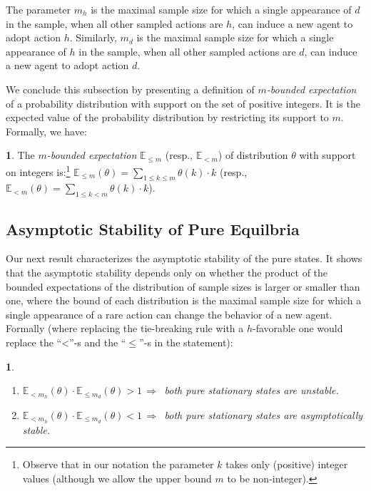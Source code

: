\documentclass[12pt]{article}
\numberwithin{equation}{section}
\numberwithin{figure}{section}
\theoremstyle{definition}
\newtheorem{defn}{\protect\definitionname}
\theoremstyle{plain}
\theoremstyle{plain}
\newtheorem{prop}{\protect\propositionname}
\theoremstyle{plain}
\theoremstyle{remark}
\theoremstyle{plain}
\theoremstyle{plain}
\providecommand{\definitionname}{Definition}
\providecommand{\propositionname}{Proposition}
\begin{document}
    The parameter $m_{h}$ is the maximal sample size for which
a single appearance of $d$ in the sample, when all other sampled actions are $h$, can induce a new agent to adopt action $h$. Similarly,  $m_{d}$ is the maximal sample size for which a single appearance of $h$ in the sample, when all other sampled actions are $d$, can induce a new agent to adopt action $d$. 
 
We conclude this subsection by presenting a definition of $m$\emph{-bounded expectation} of a probability distribution with support on the set of positive integers. It is the expected value of
the probability distribution by restricting its support to $m.$ Formally, we have:

\begin{defn}
The $m$\emph{-bounded expectation} $\mathbb{E}_{\leq m}$ (resp., $\mathbb{E}_{< m}$) of distribution $\theta$ with support on
integers is:\footnote{
Observe that in our notation the parameter $k$ takes only (positive) integer values (although we allow the upper bound $m$ to be non-integer).}
$\mathbb{E}_{\leq m}\left(\theta\right)=\sum_{1 \leq k\leq m}\theta\left(k\right)\cdot k$ (resp., $\mathbb{E}_{< m}\left(\theta\right)=\sum_{1\leq k< m}\theta\left(k\right)\cdot k$).
\end{defn}
\subsection{Asymptotic Stability of Pure Equilbria}
Our next result characterizes the asymptotic stability of the pure
states. It shows that the asymptotic stability depends only on whether the product of the bounded expectations of the distribution of sample sizes is larger or smaller than one, where the bound of each distribution is the maximal sample size for which a single appearance of a rare action can change the behavior of a new agent. Formally 
(where replacing the tie-breaking rule with a $h$-favorable one would replace the ``<''-s and the ``$\leq$''-s in the statement):
\begin{prop}
\label{prop:pure-equilbiria-satbility}
\begin{enumerate}
\item $\mathbb{E}_{< m_{h}}\left(\theta\right)\cdot \mathbb{E}_{\leq m_{d}}\left(\theta\right)>1\,\Rightarrow\,$ both pure stationary states are unstable.
\item $\mathbb{E}_{<m_{h}}\left(\theta\right)\cdot \mathbb{E}_{\leq m_{d}}\left(\theta\right)<1\,\Rightarrow\,$ both pure stationary states are asymptotically stable. 
\end{enumerate}
\end{prop}
\end{document}
